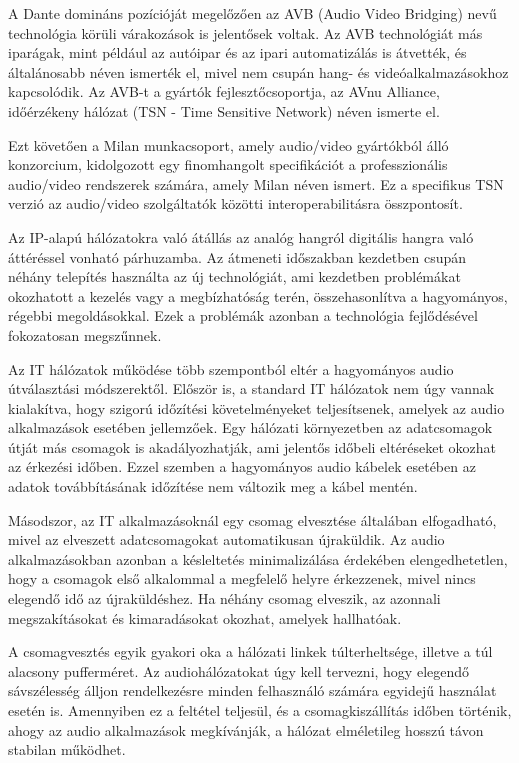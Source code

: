 A Dante domináns pozícióját megelőzően az AVB (Audio Video Bridging) nevű technológia 
körüli várakozások is jelentősek voltak. 
Az AVB technológiát más iparágak, mint például az autóipar és az ipari automatizálás is átvették, 
és általánosabb néven ismerték el, mivel nem csupán hang- és videóalkalmazásokhoz kapcsolódik. 
Az AVB-t a gyártók fejlesztőcsoportja, az AVnu Alliance, időérzékeny hálózat (TSN - Time Sensitive Network) néven ismerte el.

Ezt követően a Milan munkacsoport, amely audio/video gyártókból álló konzorcium, kidolgozott egy 
finomhangolt specifikációt a professzionális audio/video rendszerek számára, amely Milan néven ismert. 
Ez a specifikus TSN verzió az audio/video szolgáltatók közötti interoperabilitásra összpontosít.


Az IP-alapú hálózatokra való átállás az analóg hangról digitális hangra való áttéréssel vonható párhuzamba. 
Az átmeneti időszakban kezdetben csupán néhány telepítés használta az új technológiát, ami kezdetben problémákat okozhatott a kezelés vagy a megbízhatóság terén, összehasonlítva a hagyományos, régebbi megoldásokkal. 
Ezek a problémák azonban a technológia fejlődésével fokozatosan megszűnnek.

Az IT hálózatok működése több szempontból eltér a hagyományos audio útválasztási módszerektől. 
Először is, a standard IT hálózatok nem úgy vannak kialakítva, hogy szigorú időzítési 
követelményeket teljesítsenek, amelyek az audio alkalmazások esetében jellemzőek. 
Egy hálózati környezetben az adatcsomagok útját más csomagok is akadályozhatják, ami 
jelentős időbeli eltéréseket okozhat az érkezési időben. Ezzel szemben a hagyományos 
audio kábelek esetében az adatok továbbításának időzítése nem változik meg a kábel mentén.

Másodszor, az IT alkalmazásoknál egy csomag elvesztése általában elfogadható, mivel az 
elveszett adatcsomagokat automatikusan újraküldik. Az audio alkalmazásokban azonban a 
késleltetés minimalizálása érdekében elengedhetetlen, hogy a csomagok első alkalommal a 
megfelelő helyre érkezzenek, mivel nincs elegendő idő az újraküldéshez. Ha néhány csomag 
elveszik, az azonnali megszakításokat és kimaradásokat okozhat, amelyek hallhatóak.

A csomagvesztés egyik gyakori oka a hálózati linkek túlterheltsége, illetve a túl alacsony pufferméret. 
Az audiohálózatokat úgy kell tervezni, hogy elegendő sávszélesség álljon rendelkezésre minden felhasználó 
számára egyidejű használat esetén is. Amennyiben ez a feltétel teljesül, és a csomagkiszállítás időben történik, ahogy az audio alkalmazások megkívánják, a hálózat elméletileg hosszú távon stabilan működhet.

